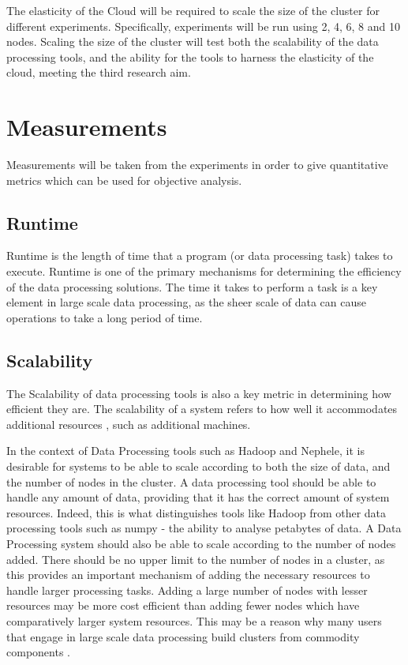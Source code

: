 The elasticity of the Cloud will be required to scale the size of the cluster for different experiments. Specifically, experiments will be run using 2, 4, 6, 8 and 10 nodes. Scaling the size of the cluster will test both the scalability of the data processing tools, and the ability for the tools to harness the elasticity of the cloud, meeting the third research aim.

\section{Measurements}
Measurements will be taken from the experiments in order to give quantitative metrics which can be used for objective analysis.  

\subsection{Runtime}
Runtime is the length of time that a program (or data processing task) takes to execute. Runtime is one of the primary mechanisms for determining the efficiency of the data processing solutions. The time it takes to perform a task is a key element in large scale data processing, as the sheer scale of data can cause operations to take a long period of time. 

\subsection{Scalability}
The Scalability of data processing tools is also a key metric in determining how efficient they are. The scalability of a system refers to how well it accommodates additional resources \cite{bondi2000characteristics}, such as additional machines. 

In the context of Data Processing tools such as Hadoop and Nephele, it is desirable for systems to be able to scale according to both the size of data, and the number of nodes in the cluster. A data processing tool should be able to handle any amount of data, providing that it has the correct amount of system resources. Indeed, this is what distinguishes tools like Hadoop from other data processing tools such as numpy - the ability to analyse petabytes of data. A Data Processing system should also be able to scale according to the number of nodes added. There should be no upper limit to the number of nodes in a cluster, as this provides an important mechanism of adding the necessary resources to handle larger processing tasks. Adding a large number of nodes with lesser resources may be more cost efficient than adding fewer nodes which have comparatively larger system resources. This may be a reason why many users that engage in large scale data processing build clusters from commodity components \cite{taylor2010overview}.  

